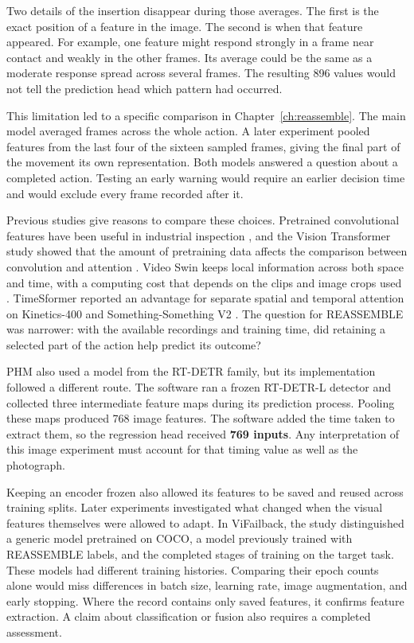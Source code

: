 Two details of the insertion disappear during those averages. The first is the exact
position of a feature in the image. The second is when that feature appeared. For
example, one feature might respond strongly in a frame near contact and weakly in the
other frames. Its average could be the same as a moderate response spread across several
frames. The resulting 896 values would not tell the prediction head which pattern had
occurred.

This limitation led to a specific comparison in Chapter~\ref{ch:reassemble}. The main model averaged
frames across the whole action. A later experiment pooled features from the last four of
the sixteen sampled frames, giving the final part of the movement its own
representation. Both models answered a question about a completed action. Testing an
early warning would require an earlier decision time and would exclude every frame
recorded after it.

Previous studies give reasons to compare these choices. Pretrained convolutional
features have been useful in industrial inspection \parencite{Roth2022Towards}, and the
Vision Transformer study showed that the amount of pretraining data affects the
comparison between convolution and attention \parencite{P010}. Video Swin keeps local
information across both space and time, with a computing cost that depends on the clips
and image crops used \parencite{P013}. TimeSformer reported an advantage for separate
spatial and temporal attention on Kinetics-400 and Something-Something V2
\parencite[Table~1]{P034}. The question for REASSEMBLE was narrower: with the available
recordings and training time, did retaining a selected part of the action help predict
its outcome?

PHM also used a model from the RT-DETR family, but its implementation followed a
different route. The software ran a frozen RT-DETR-L detector and collected three
intermediate feature maps during its prediction process. Pooling these maps produced 768
image features. The software added the time taken to extract them, so the regression
head received \textbf{769 inputs}. Any interpretation of this image experiment must
account for that timing value as well as the photograph.

Keeping an encoder frozen also allowed its features to be saved and reused across
training splits. Later experiments investigated what changed when the visual features
themselves were allowed to adapt. In ViFailback, the study distinguished a generic model
pretrained on COCO, a model previously trained with REASSEMBLE labels, and the completed
stages of training on the target task. These models had different training histories.
Comparing their epoch counts alone would miss differences in batch size, learning rate,
image augmentation, and early stopping. Where the record contains only saved features,
it confirms feature extraction. A claim about classification or fusion also requires a
completed assessment.

